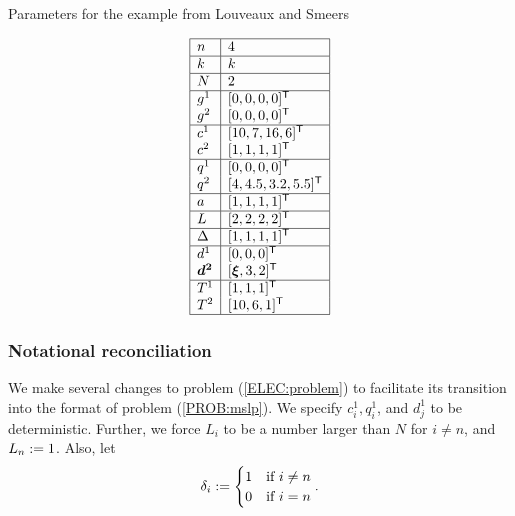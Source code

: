 \begin{table}[ht]
\caption[Example from Louveaux and Smeers \cite{smeers88}]{Parameters for the example from Louveaux and Smeers \cite{smeers88}}
\label{ELEC:results}
\begin{center}
\[
\begin{array}{|l|l|}
\hline
n	&4\\ \hline
k	&k\\ \hline
N	&2\\ \hline
g^1	&[0, 0, 0, 0]^{\mbox{\scriptsize\sf T}}\\
g^2	&[0, 0, 0, 0]^{\mbox{\scriptsize\sf T}}\\ \hline
c^1	&[10, 7, 16, 6]^{\mbox{\scriptsize\sf T}}\\
c^2	&[1, 1, 1, 1]^{\mbox{\scriptsize\sf T}} \\ \hline
q^1	&[0, 0, 0, 0]^{\mbox{\scriptsize\sf T}}\\
q^2	&[4, 4.5, 3.2, 5.5]^{\mbox{\scriptsize\sf T}}\\ \hline
a	&[1, 1, 1, 1]^{\mbox{\scriptsize\sf T}}\\ \hline
L	&[2, 2, 2, 2]^{\mbox{\scriptsize\sf T}}\\ \hline
\Delta	&[1, 1, 1, 1]^{\mbox{\scriptsize\sf T}}\\ \hline
d^1	&[0, 0, 0]^{\mbox{\scriptsize\sf T}}\\ 
\mathbf{\boldsymbol{d^2}} &[\mathbf{\boldsymbol{\xi}}, 3, 2]^{\mbox{\scriptsize\sf T}}\\ \hline
T^1	&[1, 1, 1]^{\mbox{\scriptsize\sf T}}\\
T^2	&[10, 6, 1]^{\mbox{\scriptsize\sf T}}\\ \hline
\end{array}
\]
\end{center}
\end{table}



\subsubsection{Notational reconciliation}

We make several changes to problem (\ref{ELEC:problem}) to facilitate its transition into the format of problem (\ref{PROB:mslp}).  We specify $c_i^1, q_i^1$, and $d_j^1$ to be deterministic.  Further, we force $L_i$ to be a number larger than $N$ for $i \neq n$, and $L_n := 1$.  Also, let
\begin{equation*}
\delta_i := 
\begin{cases}
	1 & \text{if } i\neq n\\
	0 & \text{if } i = n
\end{cases}.
\end{equation*}

